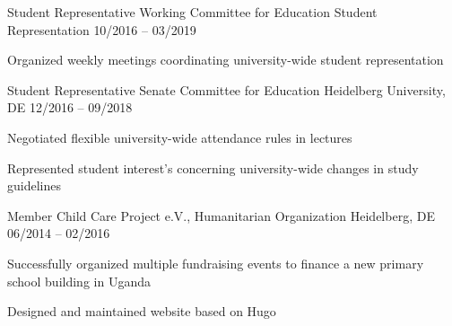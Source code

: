 \begin{cventries}
  \cventry
    {Student Representative}
    {Working Committee for Education}
    {Student Representation}
    {10/2016 -- 03/2019}
    {
      \begin{cvitems}
        \item {Organized weekly meetings coordinating university-wide student representation}
      \end{cvitems}
    }
  \cventry
    {Student Representative}
    {Senate Committee for Education}
    {Heidelberg University, DE}
    {12/2016 -- 09/2018}
    {
      \begin{cvitems}
        \item {Negotiated flexible university-wide attendance rules in lectures}
        \item {Represented student interest's concerning university-wide changes in study guidelines}
      \end{cvitems}
    }
  \cventry
    {Member}
    {Child Care Project e.V., Humanitarian Organization}
    {Heidelberg, DE}
    {06/2014 -- 02/2016}
    {
      \begin{cvitems}
        \item {Successfully organized  multiple fundraising events to finance a new primary school building in Uganda}
        \item {Designed and maintained website based on Hugo}
      \end{cvitems}
    }
\end{cventries}
